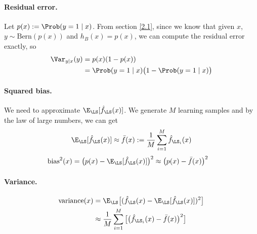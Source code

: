 \paragraph{Residual error.}
Let $p(x):=\Prob(y=1\mid x)$. From section \ref{2.1}, since we know that given $x$, $y \sim \mathrm{Bern}(p(x))$ and $h_B(x)=p(x)$, we can compute the residual error exactly, so
\begin{align*}
    \Var_{y\mid x}(y)&=p(x)(1-p(x))\\
    &= \Prob(y=1\mid x)\big(1-\Prob(y=1\mid x)\big)
\end{align*}
\paragraph{Squared bias.}
We need to approximate $\E_{\LS}[\hat{f}_{\LS}(x)]$. We generate $M$ learning samples and by the law of large numbers, we can get 
\begin{align*}
    \E_{\LS}[\hat{f}_{\LS}(x)] \approx \bar{f}(x) := \frac{1}{M}\sum_{i=1}^M\hat{f}_{\LS_i}(x)
\end{align*}
\begin{align*}
    \text{bias}^2(x) &= \big(p(x)-\E_{\LS}[\hat{f}_{\LS}(x)]\big)^2 \approx \big(p(x)-\bar{f}(x)\big)^2
\end{align*}
\paragraph{Variance.}
\begin{align*}
    \text{variance}(x)&=\E_{\LS}\big[(\hat{f}_{\LS}(x)-\E_{\LS}[\hat{f}_{\LS}(x)])^2\big]\\
    &\approx \frac{1}{M}\sum_{i=1}^M\big[\big(\hat{f}_{\LS_i}(x)-\bar{f}(x)\big)^2\big]
\end{align*}

